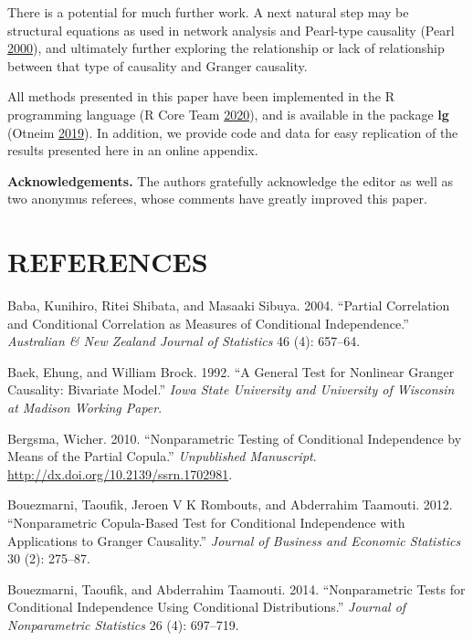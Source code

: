 \documentclass[
  12pt,
  letterpaper]{article}
\theoremstyle{definition}
\theoremstyle{definition}
\theoremstyle{definition}
\theoremstyle{remark}
\begin{document}
There is a potential for much further work. A next natural step may be structural equations as used in network analysis and Pearl-type causality (Pearl \protect\hyperlink{ref-pearl2000causality}{2000}), and ultimately further exploring the relationship or lack of relationship between that type of causality and Granger causality.

All methods presented in this paper have been implemented in the R programming language (R Core Team \protect\hyperlink{ref-r}{2020}), and is available in the package \textbf{lg} (Otneim \protect\hyperlink{ref-otneim2019lg}{2019}). In addition, we provide code and data for easy replication of the results presented here in an online appendix.

\textbf{Acknowledgements.} The authors gratefully acknowledge the editor as well as two anonymus referees, whose comments have greatly improved this paper.

\hypertarget{references}{%
\section*{REFERENCES}\label{references}}

\hypertarget{refs}{}
\leavevmode\hypertarget{ref-baba2004partial}{}%
Baba, Kunihiro, Ritei Shibata, and Masaaki Sibuya. 2004. ``Partial Correlation and Conditional Correlation as Measures of Conditional Independence.'' \emph{Australian \& New Zealand Journal of Statistics} 46 (4): 657--64.

\leavevmode\hypertarget{ref-baek:broc:1992}{}%
Baek, Ehung, and William Brock. 1992. ``A General Test for Nonlinear Granger Causality: Bivariate Model.'' \emph{Iowa State University and University of Wisconsin at Madison Working Paper}.

\leavevmode\hypertarget{ref-bergsma2011nonparametric}{}%
Bergsma, Wicher. 2010. ``Nonparametric Testing of Conditional Independence by Means of the Partial Copula.'' \emph{Unpublished Manuscript}. \url{http://dx.doi.org/10.2139/ssrn.1702981}.

\leavevmode\hypertarget{ref-bouezmarni2012nonparametric}{}%
Bouezmarni, Taoufik, Jeroen V K Rombouts, and Abderrahim Taamouti. 2012. ``Nonparametric Copula-Based Test for Conditional Independence with Applications to Granger Causality.'' \emph{Journal of Business and Economic Statistics} 30 (2): 275--87.

\leavevmode\hypertarget{ref-boue:taam:2014}{}%
Bouezmarni, Taoufik, and Abderrahim Taamouti. 2014. ``Nonparametric Tests for Conditional Independence Using Conditional Distributions.'' \emph{Journal of Nonparametric Statistics} 26 (4): 697--719.
\end{document}

